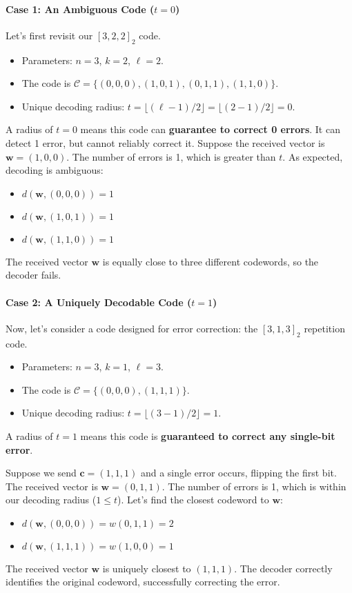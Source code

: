 \documentclass{article}
\begin{document}
\begin{tcolorbox}[title={Example: Unique Decoding in Action}]
\paragraph{Case 1: An Ambiguous Code ($t=0$)}
Let's first revisit our $[3, 2, 2]_2$ code.
\begin{itemize}
    \item Parameters: $n=3$, $k=2$, $\ell=2$.
    \item The code is $\mathcal{C} = \{ (0,0,0), (1,0,1), (0,1,1), (1,1,0) \}$.
    \item Unique decoding radius: $t = \lfloor (\ell-1)/2 \rfloor = \lfloor (2-1)/2 \rfloor = 0$.
\end{itemize}
A radius of $t=0$ means this code can \textbf{guarantee to correct 0 errors}. It can detect 1 error, but cannot reliably correct it. Suppose the received vector is $\mathbf{w} = (1,0,0)$. The number of errors is 1, which is greater than $t$. As expected, decoding is ambiguous:
\begin{itemize}
    \item $d(\mathbf{w}, (0,0,0)) = 1$
    \item $d(\mathbf{w}, (1,0,1)) = 1$
    \item $d(\mathbf{w}, (1,1,0)) = 1$
\end{itemize}
The received vector $\mathbf{w}$ is equally close to three different codewords, so the decoder fails.

\hrulefill

\paragraph{Case 2: A Uniquely Decodable Code ($t=1$)}
Now, let's consider a code designed for error correction: the $[3, 1, 3]_2$ repetition code.
\begin{itemize}
    \item Parameters: $n=3$, $k=1$, $\ell=3$.
    \item The code is $\mathcal{C} = \{ (0,0,0), (1,1,1) \}$.
    \item Unique decoding radius: $t = \lfloor (3-1)/2 \rfloor = 1$.
\end{itemize}
A radius of $t=1$ means this code is \textbf{guaranteed to correct any single-bit error}.

Suppose we send $\mathbf{c} = (1,1,1)$ and a single error occurs, flipping the first bit. The received vector is $\mathbf{w} = (0,1,1)$. The number of errors is 1, which is within our decoding radius ($1 \le t$). Let's find the closest codeword to $\mathbf{w}$:
\begin{itemize}
    \item $d(\mathbf{w}, (0,0,0)) = w(0,1,1) = 2$
    \item $d(\mathbf{w}, (1,1,1)) = w(1,0,0) = 1$
\end{itemize}
The received vector $\mathbf{w}$ is uniquely closest to $(1,1,1)$. The decoder correctly identifies the original codeword, successfully correcting the error.
\end{tcolorbox}
\end{document}
